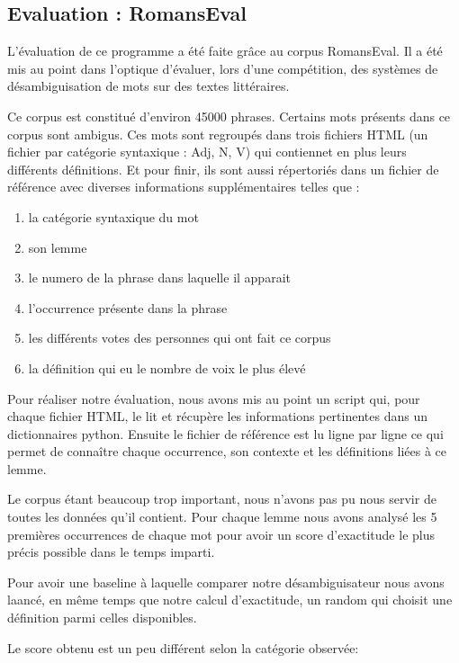 \subsection{Evaluation : RomansEval}

L'évaluation de ce programme a été faite grâce au corpus RomansEval. Il a été 
mis au point dans l'optique d'évaluer, lors d'une compétition, des 
systèmes de désambiguisation de mots sur des textes littéraires. 

Ce corpus est constitué d'environ 45000 phrases. Certains mots présents dans ce 
corpus sont ambigus. Ces mots sont regroupés dans trois fichiers HTML (un 
fichier par catégorie syntaxique : Adj, N, V) qui contiennet en plus leurs 
différents définitions. Et pour finir, ils sont aussi répertoriés dans un 
fichier de référence avec diverses informations supplémentaires telles que :

\begin{enumerate}
 \item la catégorie syntaxique du mot
 \item son lemme
 \item le numero de la phrase dans laquelle il apparait
 \item l'occurrence présente dans la phrase
 \item les différents votes des personnes qui ont fait ce corpus
 \item la définition qui eu le nombre de voix le plus élevé
 \end{enumerate}

Pour réaliser notre évaluation, nous avons mis au point un script qui, pour 
chaque fichier HTML, le lit et récupère les informations pertinentes dans un 
dictionnaires python. Ensuite le fichier de référence est lu ligne par ligne 
ce qui permet de connaître chaque occurrence, son contexte et les définitions 
liées à ce lemme.

Le corpus étant beaucoup trop important, nous n'avons pas pu nous servir de 
toutes les données qu'il contient. Pour chaque lemme nous avons analysé les 5 
premières occurrences de chaque mot pour avoir un score d'exactitude le plus 
précis possible dans le temps imparti.

Pour avoir une baseline à laquelle comparer notre désambiguisateur nous avons 
laancé, en même temps que notre calcul d'exactitude, un random qui choisit une 
définition parmi celles disponibles.

Le score obtenu est un peu différent selon la catégorie observée:

